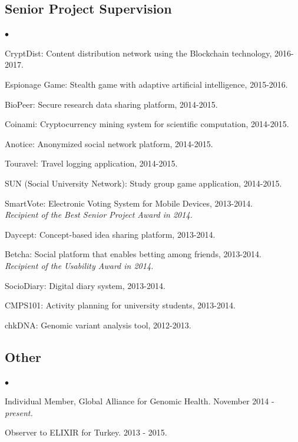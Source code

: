 \documentclass[margin,line]{res}
\newenvironment{list2}{
  \begin{list}{$\bullet$}{%
      \setlength{\itemsep}{0in}
      \setlength{\parsep}{0in} \setlength{\parskip}{0in}
      \setlength{\topsep}{0in} \setlength{\partopsep}{0in} 
      \setlength{\leftmargin}{0.2in}}}{\end{list}}
\begin{document}
\begin{resume}
\vspace{-0.4cm}
\subsection{\small \sc Senior Project Supervision}
\begin{list2}
  \item CryptDist: Content distribution network using the Blockchain technology, 2016-2017.
\item Espionage Game: Stealth game with adaptive artificial intelligence, 2015-2016.
  \item BioPeer: Secure research data sharing platform, 2014-2015.
  \item Coinami: Cryptocurrency mining system for scientific computation, 2014-2015.
  \item Anotice: Anonymized social network platform, 2014-2015.
  \item Touravel: Travel logging application, 2014-2015. 
  \item SUN (Social University Network): Study group game application, 2014-2015.
  \item SmartVote: Electronic Voting System for Mobile Devices, 2013-2014. \\
    {\it Recipient of the Best Senior Project Award in 2014.}
  \item Daycept: Concept-based idea sharing platform, 2013-2014.
  \item Betcha: Social platform that enables betting among friends, 2013-2014.\\
    {\it Recipient of the Usability Award in 2014.}
  \item SocioDiary: Digital diary system, 2013-2014.
  \item CMPS101: Activity planning for university students, 2013-2014.
  \item chkDNA: Genomic variant analysis tool, 2012-2013.
\end{list2}


\vspace{-0.4cm}
\subsection{\small \sc Other}
\begin{list2}
\item
  Individual Member, Global Alliance for Genomic Health. November 2014 - {\it present.}
\item
  Observer to ELIXIR for Turkey. 2013 - 2015.
\end{list2}



\end{resume}
\end{document}
